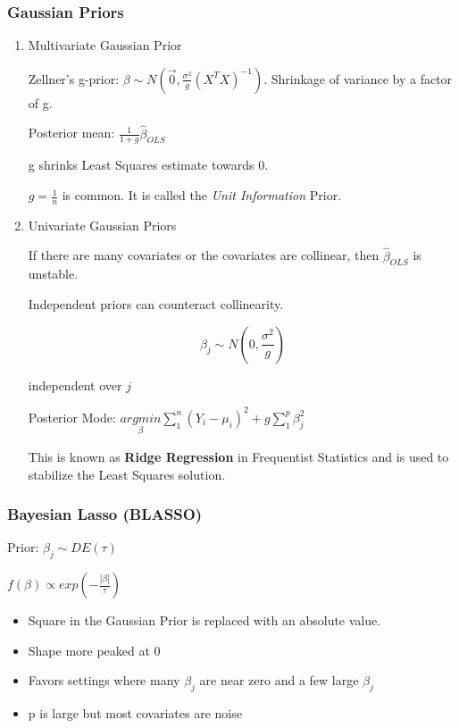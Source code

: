 \documentclass[11pt]{article}
\begin{document}
\subsubsection{Gaussian Priors}
\label{sec:org39ccf6b}
\begin{enumerate}
\item Multivariate Gaussian Prior
\label{sec:org587c02c}

Zellner's g-prior: \(\beta \sim N(\vec 0, \frac{\sigma^2}{g} (X^T X)^{-1})\).
Shrinkage of variance by a factor of g.

Posterior mean: \(\frac{1}{1 + g}  \hat \beta_{OLS}\)

g shrinks Least Squares estimate towards 0.

\(g = \frac{1}{n}\) is common. It is called the \emph{Unit Information} Prior.

\item Univariate Gaussian Priors
\label{sec:org7c7347a}

If there are many covariates or the covariates are collinear, then \(\hat
\beta_{OLS}\) is unstable.

Independent priors can counteract collinearity.

$$
\beta_j \sim N(0, \frac{\sigma^2}{g})
$$

independent over \(j\)

Posterior Mode: \(\underset{\beta}{argmin} \sum_{1}^{n} (Y_i - \mu_i)^2 + g \sum_{1}^{p} \beta_j^2\)

This is known as \textbf{Ridge Regression} in Frequentist Statistics and is used to
stabilize the Least Squares solution.
\end{enumerate}

\subsubsection{Bayesian Lasso (BLASSO)}
\label{sec:org5e27ba1}

Prior: \(\beta_j \sim DE (\tau)\)

\(f(\beta) \propto exp \left( - \frac{|\beta|}{\tau} \right)\)

\begin{itemize}
\item Square in the Gaussian Prior is replaced with an absolute value.
\item Shape more peaked at 0
\item Favors settings where many \(\beta_j\) are near zero and a few large \(\beta_j\)
\item p is large but most covariates are noise
\end{itemize}
\end{document}
